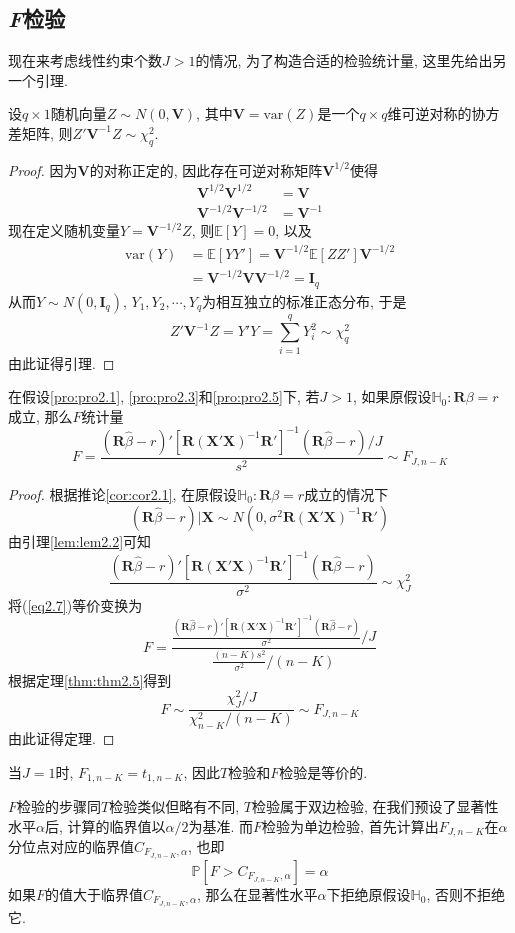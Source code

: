 \documentclass[cn, 12pt, math=mtpro2, bibstyle=apa, blue, twocol]{elegantbook}
\newcommand{\RH}{\mathbold{R}}
\newcommand{\E}{\mathbb{E}}
\newcommand{\PP}{\mathbb{P}}
\newcommand{\var}{\text{var}}
\newcommand{\X}{\mathbold{X}}
\newcommand{\hb}{\hat{\beta}}
\newcommand{\HH}{\mathbb{H}}
\newcommand{\V}{\mathbold{V}}
\begin{document}
\subsection{\emph{F}检验}
现在来考虑线性约束个数$J>1$的情况, 为了构造合适的检验统计量, 这里先给出另一个引理.
\begin{lemma}\label{lem:lem2.2}
设$q\times 1$随机向量$Z\sim N(0,\mathbold{V})$, 其中$\mathbold{V}=\var(Z)$是一个$q\times q$维可逆对称的协方差矩阵, 则$Z'\mathbold{V}^{-1}Z\sim \chi^2_q$.
\end{lemma}
\begin{proof}
  因为$\V$的对称正定的, 因此存在可逆对称矩阵$\V^{1/2}$使得
  \begin{align*}
  \V^{1/2}\V^{1/2}&=\V \\
  \V^{-1/2}\V^{-1/2}&=\V^{-1}
  \end{align*}
  现在定义随机变量$Y=\V^{-1/2}Z$, 则$\E[Y]=0$, 以及
  \begin{align*}
  \var(Y)&=\E[YY']=\V^{-1/2}\E[ZZ']\V^{-1/2} \\
  &=\V^{-1/2}\V\V^{-1/2}=\mathbold{I}_q
  \end{align*}
  从而$Y\sim N(0,\mathbold{I}_q)$, $Y_1,Y_2,\cdots,Y_q$为相互独立的标准正态分布, 于是
  $$Z'\V^{-1}Z=Y'Y=\sum_{i=1}^{q}Y_i^2\sim \chi_q^2$$
  由此证得引理.
\end{proof}
\begin{theorem}[$F$统计量的分布]
  在假设\ref{pro:pro2.1}, \ref{pro:pro2.3}和\ref{pro:pro2.5}下, 若$J>1$, 如果原假设$\HH_0:\RH\beta=r$成立, 那么$F$统计量
  \begin{equation}\label{eq2.7}
    F=\frac{(\RH\hb-r)'[\RH(\X'\X)^{-1}\RH']^{-1}(\RH\hb-r)/J}{s^2}\sim F_{J,n-K}
  \end{equation}
\end{theorem}
\begin{proof}
   根据推论\ref{cor:cor2.1}, 在原假设$\HH_0:\RH\beta=r$成立的情况下
  $$(\RH\hb-r)|\X\sim N(0,\sigma^2\mathbold{R}(\X'\X)^{-1}\mathbold{R}')$$
  由引理\ref{lem:lem2.2}可知
  $$\frac{(\RH\hb-r)'[\RH(\X'\X)^{-1}\RH']^{-1}(\RH\hb-r)}{\sigma^2}\sim\chi_J^2$$
  将(\ref{eq2.7})等价变换为
  $$F=\frac{\displaystyle \frac{(\RH\hb-r)'[\RH(\X'\X)^{-1}\RH']^{-1}(\RH\hb-r)}{\sigma^2}/J}{\displaystyle\frac{(n-K)s^2}{\sigma^2}/(n-K)}$$
  根据定理\ref{thm:thm2.5}得到
  $$F\sim\frac{\chi^2_J/J}{\chi^2_{n-K}/(n-K)}\sim F_{J,n-K}$$
  由此证得定理.

\end{proof}
\begin{remark}
当$J=1$时, $F_{1,n-K}=t_{1,n-K}$, 因此$T$检验和$F$检验是等价的.
\end{remark}
$F$检验的步骤同$T$检验类似但略有不同, $T$检验属于双边检验, 在我们预设了显著性水平$\alpha$后, 计算的临界值以$\alpha/2$为基准. 而$F$检验为单边检验, 首先计算出$F_{J,n-K}$在$\alpha$分位点对应的临界值$C_{F_{J,n-K},\alpha}$, 也即
$$\PP[F>C_{F_{J,n-K},\alpha}]=\alpha$$
如果$F$的值大于临界值$C_{F_{J,n-K},\alpha}$, 那么在显著性水平$\alpha$下拒绝原假设$\HH_0$, 否则不拒绝它.
\end{document}
